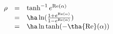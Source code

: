 \begin{equation}
\begin{array}{lll}
\rho &=& \tanh^{-1}e^{{\rm Re}(\alpha)}\\
&=& \ha \ln (\frac{1+e^{{\rm Re}(\alpha)}}{1-e^{{\rm Re}(\alpha)}})\\
&=& \ha \ln \tanh (-\tha{\rm Re}(\alpha))
\end{array}
\end{equation}

